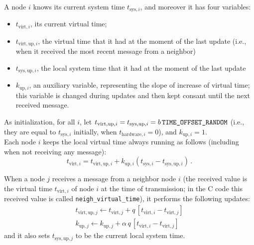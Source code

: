 \documentclass{article}
\begin{document}
A node $i$ knows its current system time $t_{\text{sys}, i}$, and moreover it has four variables:
\begin{itemize}
\item $t_{\text{virt}, i}$, its current virtual time;
\item $t_{\text{virt}, \text{up}, i}$, the virtual time that it had at the moment of the last update (i.e., when it received the most recent message from a neighbor)
\item  $t_{\text{sys}, \text{up}, i}$, the local system time that it had at the moment of the last update
\item $k_{\text{up},i}$, an	 auxiliary variable, representing the slope of increase of virtual time; this variable is changed during updates and then kept consant until the next received message.
\end{itemize}


As initialization, for all $i$, let $t_{\text{virt}, \text{up}, i}= t_{\text{sys}, \text{up}, i}= b \, \verb=TIME_OFFSET_RANDOM=  $ (i.e., they are equal to $t_{\text{sys}, i}$ initially, when $t_{\text{hardware}, i} =0$), and  $k_{\text{up},i}=1$. \\

Each node $i$ keeps the local virtual time always running as follows (including when not receiving any message):
\[ %
t_{\text{virt}, i} = t_{\text{virt}, \text{up}, i}
	+ k_{\text{up}, i}(t_{\text{sys},  i} - t_{\text{sys}, \text{up}, i}) \,.
\] %

When a node $j$ receives a message from a neighbor node $i$ (the received value  is the virtual time $t_{\text{virt}, i}$ of node $i$ at the time of transmission; in the C code this received value is called \verb=neigh_virtual_time=), it performs the following updates:
\begin{align*}
t_{\text{virt},\text{up}, j} \leftarrow
	t_{\text{virt}, j}
	+ q \, [t_{\text{virt}, i} - t_{\text{virt}, j}]
 \\
k_{\text{up},j} \leftarrow
	k_{\text{up},j}
	+ \alpha \, q \, [t_{\text{virt}, i} - t_{\text{virt}, j}]
\end{align*}
and it also sets $t_{\text{sys}, \text{up}, j}$ to be the current local system time.\\
\end{document}
